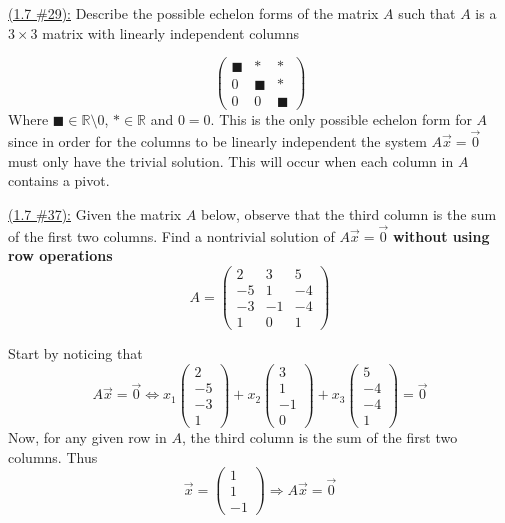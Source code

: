 \documentclass{exam}
\newcommand{\RR}{\mathbb R}
\begin{document}
\underline{(1.7 \#29):} Describe the possible echelon forms of the matrix $A$ such that $A$ is a $3 \times 3$ matrix with linearly independent columns
\begin{solution}
    \[
        \boxed{
            \begin{pmatrix}
                \blacksquare & * & * \\
                0 & \blacksquare & * \\
                0 & 0 & \blacksquare
            \end{pmatrix}
        }
    \]
    Where $\blacksquare\in\RR \setminus {0}$, $* \in \RR$ and $0=0$. This is the only possible echelon form for $A$ since in order for the columns to be linearly independent the system $A\vec{x}=\vec{0}$ must only have the trivial solution. This will occur when each column in $A$ contains a pivot.
\end{solution}

\underline{(1.7 \#37):} Given the matrix $A$ below, observe that the third column is the sum of the first two columns. Find a nontrivial solution of $A\vec{x}=\vec{0}$ \textbf{without using row operations}
\[
    A = \begin{pmatrix}
        2 & 3 & 5 \\
        -5 & 1 & -4 \\
        -3 & -1 & -4 \\
        1 & 0 & 1
    \end{pmatrix}
\]
\begin{solution}
    Start by noticing that
    \[
        A\vec{x} = \vec{0} \Leftrightarrow 
        x_1\begin{pmatrix}
            2 \\ -5 \\ -3 \\ 1
        \end{pmatrix}
        + 
        x_2\begin{pmatrix}
            3 \\ 1 \\ -1 \\ 0
        \end{pmatrix}
        + 
        x_3\begin{pmatrix}
            5 \\ -4 \\ -4 \\ 1
        \end{pmatrix}
        = \vec{0}
    \]
    Now, for any given row in $A$, the third column is the sum of the first two columns. Thus
    \[
        \boxed{\vec{x} = \begin{pmatrix} 1 \\ 1 \\ -1\end{pmatrix}} \Rightarrow A\vec{x} = \vec{0}
    \]
\end{solution}
\end{document}
